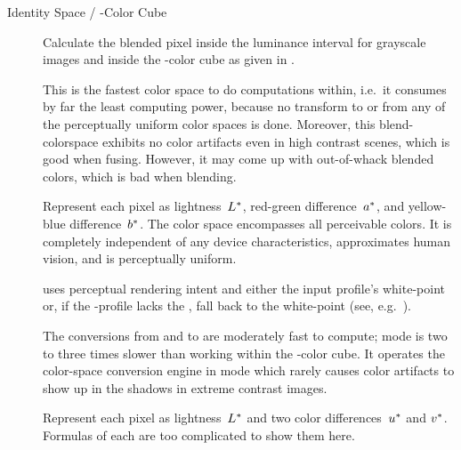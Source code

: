 \begin{description}
\item[Identity Space / \acronym{RGB}-Color Cube]\itemend
  Calculate the blended pixel inside the luminance interval 
  for grayscale images and inside the -color cube as given in
  .

  This is the fastest color space to do computations within, i.e.\ it consumes by far the least
  computing power, because no transform to or from any of the perceptually uniform color spaces
  is done.  Moreover, this blend-colorspace exhibits no color artifacts even in high contrast
  scenes, which is good when fusing.  However, it may come up with out-of-whack blended colors,
  which is bad when blending.

\item[\urlmark{\wikipedialabcolorspace}{\acronym{L*a*b*}}]\itemend\urltext
  Represent each pixel as lightness~$L\mbox{${}^{*}$}$, red-green difference~$a\mbox{${}^{*}$}$,
  and yellow-blue difference~$b\mbox{${}^{*}$}$.  The  color space encompasses
  all perceivable colors.  It is completely independent of any device characteristics,
  approximates human vision, and is perceptually uniform.

  \App{} uses perceptual rendering intent and either the input profile's white-point or, if the
  -profile lacks the , fall back to the
   white-point (see, e.g.\ ).

  The conversions from and to  are moderately fast to compute; 
  mode is two to three times slower than working within the -color cube.  It
  operates the  color-space conversion engine in
   mode which rarely causes color artifacts to show
  up in the shadows in extreme contrast images.

\item[\urlmark{\wikipediacieluvcolorspace}{\acronym{CIEL*u*v*}}]\itemend\urltext
  Represent each pixel as lightness~$L\mbox{${}^{*}$}$ and two color
  differences~$u\mbox{${}^{*}$}$ and $v\mbox{${}^{*}$}$.  Formulas of each are too complicated
  to show them here.


\end{description}
